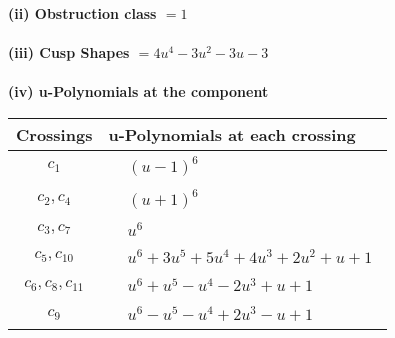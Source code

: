 \documentclass[1p]{elsarticle_modified}
\theoremstyle{definition}
\begin{document}
\flushleft \textbf{(ii) Obstruction class $= 1$}\\~\\
\flushleft \textbf{(iii) Cusp Shapes $= 4 u^4-3 u^2-3 u-3$}\\~\\
\newpage\renewcommand{\arraystretch}{1}
\flushleft \textbf{(iv) u-Polynomials at the component}\newline \\
\begin{tabular}{m{50pt}|m{274pt}}
Crossings & \hspace{64pt}u-Polynomials at each crossing \\
\hline $$\begin{aligned}c_{1}\end{aligned}$$&$\begin{aligned}
&(u-1)^6
\end{aligned}$\\
\hline $$\begin{aligned}c_{2},c_{4}\end{aligned}$$&$\begin{aligned}
&(u+1)^6
\end{aligned}$\\
\hline $$\begin{aligned}c_{3},c_{7}\end{aligned}$$&$\begin{aligned}
&u^6
\end{aligned}$\\
\hline $$\begin{aligned}c_{5},c_{10}\end{aligned}$$&$\begin{aligned}
&u^6+3 u^5+5 u^4+4 u^3+2 u^2+u+1
\end{aligned}$\\
\hline $$\begin{aligned}c_{6},c_{8},c_{11}\end{aligned}$$&$\begin{aligned}
&u^6+u^5- u^4-2 u^3+u+1
\end{aligned}$\\
\hline $$\begin{aligned}c_{9}\end{aligned}$$&$\begin{aligned}
&u^6- u^5- u^4+2 u^3- u+1
\end{aligned}$\\
\hline
\end{tabular}\\~\\
\end{document}

